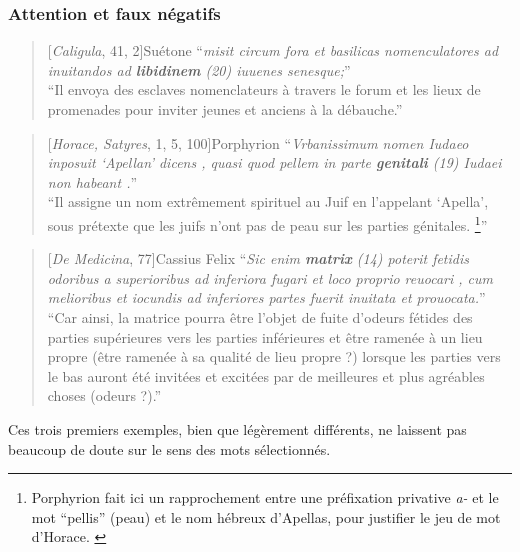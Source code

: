 \subsubsection{Attention et faux négatifs}

\begin{quote}[\textit{Caligula}, 41, 2]{Suétone}
    \enquote{\textit{misit circum fora et basilicas nomenculatores ad inuitandos ad \textbf{libidinem} (20) iuuenes senesque;}} \\
    \enquote{Il envoya des esclaves nomenclateurs à travers le forum et les lieux de promenades pour inviter jeunes et anciens à la débauche.}
\end{quote}

\begin{quote}[\textit{Horace, Satyres}, 1, 5, 100]{Porphyrion}
    \enquote{\textit{Vrbanissimum nomen Iudaeo inposuit ‘Apellan’ dicens , quasi quod pellem in parte \textbf{genitali} (19) Iudaei non habeant .}} \\
    \enquote{Il assigne un nom extrêmement spirituel au Juif en l'appelant ‘Apella’, sous prétexte que les juifs n'ont pas de peau sur les parties génitales. \footnote{Porphyrion fait ici un rapprochement entre une préfixation privative \textit{a-} et le mot ``pellis'' (peau) et le nom hébreux d'Apellas, pour justifier le jeu de mot d'Horace. \textcite{cordier2001romains}}}
\end{quote}

\begin{quote}[\textit{De Medicina}, 77]{Cassius Felix}
    \enquote{\textit{Sic enim \textbf{matrix} (14) poterit fetidis odoribus a superioribus ad inferiora fugari et loco proprio reuocari , cum melioribus et iocundis ad inferiores partes fuerit inuitata et prouocata.}} \\
    \enquote{Car ainsi, la matrice pourra être l'objet de fuite d'odeurs fétides des parties supérieures vers les parties inférieures et être ramenée à un lieu propre (être ramenée à sa qualité de lieu propre ?) lorsque les parties vers le bas auront été invitées et excitées par de meilleures et plus agréables choses (odeurs ?).}
\end{quote}

Ces trois premiers exemples, bien que légèrement différents, ne laissent pas beaucoup de doute sur le sens des mots sélectionnés. 

